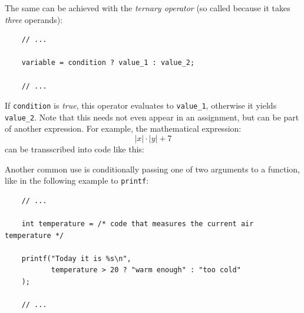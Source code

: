 The same can be achieved with the \emph{ternary operator} (so called because it takes \emph{three} operands):
\begin{codebox}[conditionalAssignmentTernaryOperator.c]
\begin{verbatim}
    // ...
    
    variable = condition ? value_1 : value_2;
    
    // ...
\end{verbatim}
\end{codebox}

If \texttt{condition} is \emph{true}, this operator evaluates to \texttt{value\_1}, otherwise it yields \texttt{value\_2}. Note that this needs not even appear in an assignment, but can be part of another expression. For example, the mathematical expression:
\[ |x| \cdot |y| + 7 \]
can be transscribed into code like this:
\begin{center}
\end{center}

Another common use is conditionally passing one of two arguments to a function, like in the following example to \texttt{printf}:
\begin{codebox}[conditionalString.c]
\begin{verbatim}
    // ...
    
    int temperature = /* code that measures the current air temperature */
    
    printf("Today it is %s\n",
           temperature > 20 ? "warm enough" : "too cold"
    );
    
    // ...
\end{verbatim}
\end{codebox}


